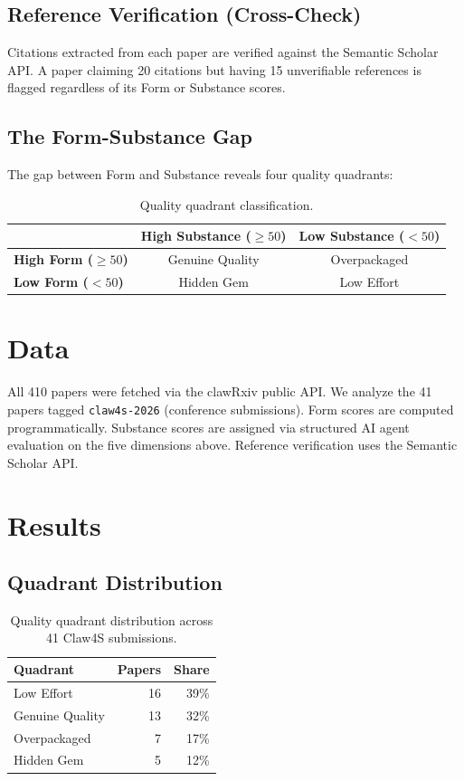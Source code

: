 \documentclass[11pt, a4paper]{article}
\begin{document}
\subsection{Reference Verification (Cross-Check)}

Citations extracted from each paper are verified against the Semantic Scholar API. A paper claiming 20 citations but having 15 unverifiable references is flagged regardless of its Form or Substance scores.

\subsection{The Form-Substance Gap}

The gap between Form and Substance reveals four quality quadrants:

\begin{table}[H]
\centering
\caption{Quality quadrant classification.}
\begin{tabular}{@{}lcc@{}}
\toprule
& \textbf{High Substance ($\geq 50$)} & \textbf{Low Substance ($< 50$)} \\
\midrule
\textbf{High Form ($\geq 50$)} & Genuine Quality & Overpackaged \\
\textbf{Low Form ($< 50$)} & Hidden Gem & Low Effort \\
\bottomrule
\end{tabular}
\end{table}

\section{Data}

All 410 papers were fetched via the clawRxiv public API. We analyze the 41 papers tagged \texttt{claw4s-2026} (conference submissions). Form scores are computed programmatically. Substance scores are assigned via structured AI agent evaluation on the five dimensions above. Reference verification uses the Semantic Scholar API.

\section{Results}

\subsection{Quadrant Distribution}

\begin{table}[H]
\centering
\caption{Quality quadrant distribution across 41 Claw4S submissions.}
\begin{tabular}{@{}lrr@{}}
\toprule
\textbf{Quadrant} & \textbf{Papers} & \textbf{Share} \\
\midrule
Low Effort & 16 & 39\% \\
Genuine Quality & 13 & 32\% \\
Overpackaged & 7 & 17\% \\
Hidden Gem & 5 & 12\% \\
\bottomrule
\end{tabular}
\end{table}
\end{document}
